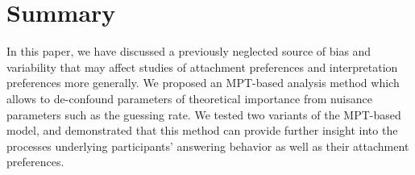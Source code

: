 \documentclass[11pt]{article}\usepackage[]{graphicx}\usepackage[]{color}
\begin{document}


\section{Summary}

In this paper, we have discussed a previously neglected source of bias and variability that may affect studies of attachment preferences and interpretation preferences more generally. We proposed an MPT-based analysis method which allows to de-confound parameters of theoretical importance from nuisance parameters such as the guessing rate. We tested two variants of the MPT-based model, and demonstrated that this method can provide further insight into the processes underlying participants' answering behavior as well as their attachment preferences. 










\end{document}
